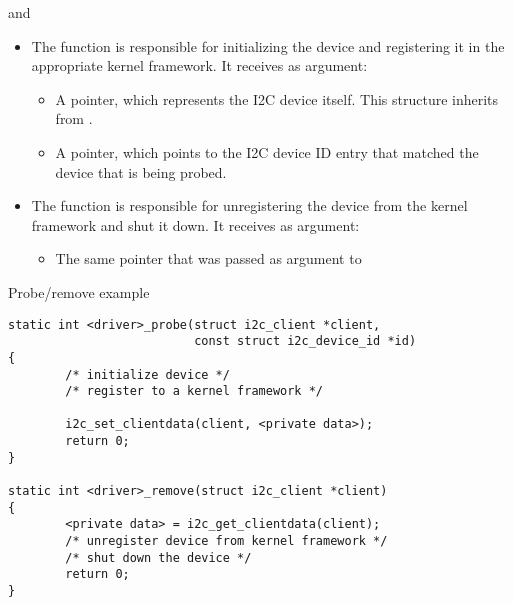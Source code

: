 \begin{frame}{ and }

  \begin{itemize}
  \item The  function is responsible for initializing
    the device and registering it in the appropriate kernel
    framework. It receives as argument:
    \begin{itemize}
    \item A  pointer, which represents the I2C
      device itself. This structure inherits from .
    \item A  pointer, which points to the
      I2C device ID entry that matched the device that is being
      probed.
    \end{itemize}
  \item The  function is responsible for
    unregistering the device from the kernel framework and shut it
    down. It receives as argument:
    \begin{itemize}
    \item The same  pointer that was passed as
      argument to 
    \end{itemize}
  \end{itemize}
\end{frame}

\begin{frame}[fragile]{Probe/remove example}
  \begin{block}{}
    \begin{verbatim}
static int <driver>_probe(struct i2c_client *client,
                          const struct i2c_device_id *id)
{
        /* initialize device */
        /* register to a kernel framework */

        i2c_set_clientdata(client, <private data>);
        return 0;
}

static int <driver>_remove(struct i2c_client *client)
{
        <private data> = i2c_get_clientdata(client);
        /* unregister device from kernel framework */
        /* shut down the device */
        return 0;
}
    \end{verbatim}
  \end{block}
\end{frame}